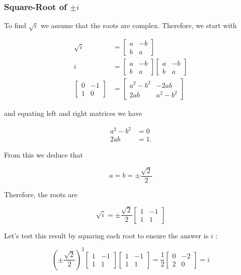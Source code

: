 \documentclass[10pt]{article}
\begin{document}
\subsubsection{Square-Root of $\pm i$}
To find $\sqrt{i}$ we assume that the roots are complex. Therefore, we start with

$$
\begin{aligned}
\sqrt{i} & =\left[\begin{array}{cc}
a & -b \\
b & a
\end{array}\right] \\
i & =\left[\begin{array}{cc}
a & -b \\
b & a
\end{array}\right]\left[\begin{array}{cc}
a & -b \\
b & a
\end{array}\right] \\
{\left[\begin{array}{cc}
0 & -1 \\
1 & 0
\end{array}\right] } & =\left[\begin{array}{cc}
a^{2}-b^{2} & -2 a b \\
2 a b & a^{2}-b^{2}
\end{array}\right]
\end{aligned}
$$

and equating left and right matrices we have

$$
\begin{aligned}
a^{2}-b^{2} & =0 \\
2 a b & =1 .
\end{aligned}
$$

From this we deduce that

$$
a=b= \pm \frac{\sqrt{2}}{2}
$$

Therefore, the roots are

$$
\sqrt{i}= \pm \frac{\sqrt{2}}{2}\left[\begin{array}{cc}
1 & -1 \\
1 & 1
\end{array}\right]
$$

Let's test this result by squaring each root to ensure the answer is $i$ :

$$
\left( \pm \frac{\sqrt{2}}{2}\right)^{2}\left[\begin{array}{cc}
1 & -1 \\
1 & 1
\end{array}\right]\left[\begin{array}{cc}
1 & -1 \\
1 & 1
\end{array}\right]=\frac{1}{2}\left[\begin{array}{cc}
0 & -2 \\
2 & 0
\end{array}\right]=i
$$
\end{document}
